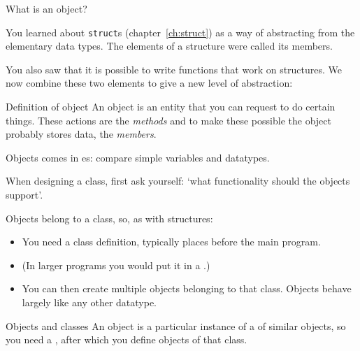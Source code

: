 
 {What is an object?}
\label{sec:object}

You learned about \lstinline{struct}s (chapter~\ref{ch:struct}) as a way of
abstracting from the elementary data types. The elements of a
structure were called its members.

You also saw that it is possible to write
functions that work on structures. We now combine these two elements
to give a new level of abstraction:

\begin{block}{Definition of object}
  \label{sl:object-def}
  An object is an entity that you can request to do certain
  things. These actions are the
  \emph{methods}
  and to make these possible the object probably stores
  data, the
  \emph{members}.

  Objects comes in es: compare simple variables and datatypes.

  When designing a class, first ask yourself: `what functionality
  should the objects support'.

\end{block}

Objects belong to a class, so, as with structures:
\begin{itemize}
\item You need a class definition, typically places before the main
  program.
\item (In larger programs you would put it in a
  .)
\item You can then create multiple objects belonging to that
  class. Objects behave largely like any other datatype.
\end{itemize}

\begin{slide}{Objects and classes}
  \label{label:class-def}
  An object is a particular instance of a  of
  similar objects, so you need a ,
  after which you define objects of that class.
\end{slide}

